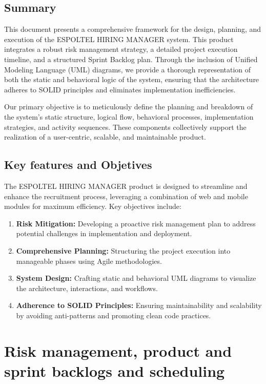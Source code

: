 \documentclass{scrreprt}
\newcounter{sprint}
\begin{document}
\section{Summary}
This document presents a comprehensive framework for the design, planning, and execution of the ESPOLTEL HIRING MANAGER system. This product integrates a robust risk management strategy, a detailed project execution timeline, and a structured Sprint Backlog plan. Through the inclusion of Unified Modeling Language (UML) diagrams, we provide a thorough representation of both the static and behavioral logic of the system, ensuring that the architecture adheres to SOLID principles and eliminates implementation inefficiencies.

Our primary objective is to meticulously define the planning and breakdown of the system’s static structure, logical flow, behavioral processes, implementation strategies, and activity sequences. These components collectively support the realization of a user-centric, scalable, and maintainable product.

\section{Key features and Objetives}
The ESPOLTEL HIRING MANAGER product is designed to streamline and enhance the recruitment process, leveraging a combination of web and mobile modules for maximum efficiency. Key objectives include:

\begin{enumerate}
	\item \textbf{Risk Mitigation:} Developing a proactive risk management plan to address potential challenges in implementation and deployment.
	\item \textbf{Comprehensive Planning:} Structuring the project execution into manageable phases using Agile methodologies.
	\item \textbf{System Design:} Crafting static and behavioral UML diagrams to visualize the architecture, interactions, and workflows.
	\item \textbf{Adherence to SOLID Principles:} Ensuring maintainability and scalability by avoiding anti-patterns and promoting clean code practices.
\end{enumerate}

\chapter{Risk management, product and sprint backlogs and scheduling}
\end{document}
